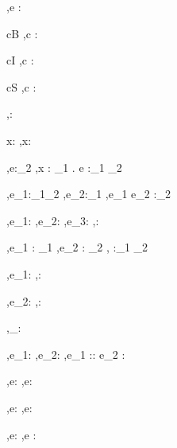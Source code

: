 



  {\Gamma,\Sigma \infers e : \tau}


  {c\in B}
  {\Gamma,\Sigma\infers c : \Bool}

  {c\in I}
  {\Gamma,\Sigma\infers c : \Int}

  {c\in S}
  {\Gamma,\Sigma\infers c : \String}


  { }
  {\Gamma,\Sigma\infers \unit : \Unit}


  {x:\tau\in\Gamma}
  {\Gamma,\Sigma\infers x:\tau}


  {\Gamma[x:\tau_1] ,\Sigma \infers e:\tau_2}
  {\Gamma,\Sigma \infers \lambda x : \tau_1 . e :\tau_1 \to \tau_2}

  {\Gamma,\Sigma \infers e_1:\tau_1\to\tau_2 \Quad
   \Gamma,\Sigma \infers e_2:\tau_1}
  {\Gamma,\Sigma \infers e_1 e_2 :\tau_2}


  {\Gamma,\Sigma \infers e_1:\Bool \Quad
   \Gamma,\Sigma \infers e_2:\tau \Quad
   \Gamma,\Sigma \infers e_3:\tau}
  {\Gamma,\Sigma \infers {}:\tau}


    {\Gamma,\Sigma \infers e_1 : \tau_1  \Quad
     \Gamma,\Sigma \infers e_2 : \tau_2}
    {\Gamma,\Sigma \infers {} :\tau_1 \times \tau_2}

  {\Gamma,\Sigma\infers e_1:\tau}
  {\Gamma,\Sigma\infers \Fst {}:\tau}

    {\Gamma,\Sigma\infers e_2:\tau}
    {\Gamma,\Sigma\infers \Snd {}:\tau}

  { }
  {\Gamma,\Sigma\infers [\ ]_\beta : \List\beta}

  {\Gamma,\Sigma\infers e_1:\beta \Quad
   \Gamma,\Sigma\infers e_2:\List\beta}
  {\Gamma,\Sigma\infers e_1 :: e_2 : \List \beta}

  {\Gamma,\Sigma\infers e:\List\beta}
  {\Gamma,\Sigma\infers \Head e:\beta}

    {\Gamma,\Sigma\infers e:\List\beta}
    {\Gamma,\Sigma\infers \Tail e:\List\beta}



  {\Gamma,\Sigma \infers e:\beta}
  {\Gamma,\Sigma \infers \Ref e :\Reference \beta}

